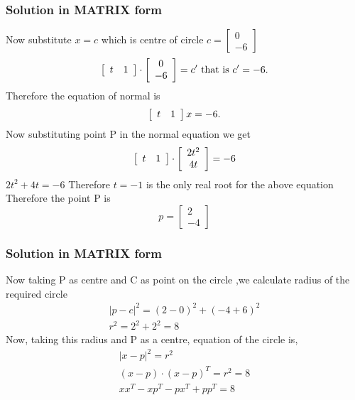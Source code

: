 \documentclass{beamer}
\begin{document}
\begin{frame}
\frametitle{Solution in MATRIX form}
Now substitute $x=c$ which is centre of circle  $c=\left[ 
  \begin{array}{ c  }
     0\\
    -6
  \end{array} \right]$
  \[
  \left[ 
  \begin{array}{ c c }
     t&1
  \end{array} \right]\cdot \left[ 
  \begin{array}{ c }
     0\\
    -6
  \end{array} \right]=c^{\prime}
  \text{ that is  }  c^{\prime}=-6.
  \]
  Therefore the equation of normal is
  \[\left[ 
  \begin{array}{ c c }
     t&1
  \end{array} \right]x=-6.
  \]
  Now substituting point P in the normal equation we get 
  \[
  \left[ 
  \begin{array}{ c c }
     t&1\\
  \end{array} \right]\cdot \left[ 
  \begin{array}{ c }
     2t^2\\
     4t
  \end{array} \right]=-6
  \]
   $2t^2+4t=-6$
Therefore $t=-1$ is the only real root for the above equation 
Therefore the point P is 
$$p=\left[ 
  \begin{array}{ c  }
     2\\
    -4
  \end{array} \right]
 $$

\end{frame}


\begin{frame}
\frametitle{Solution in MATRIX form}
Now taking P as centre and C as point on the circle ,we calculate radius of the required circle
\begin{gather*}
|p-c|^{2}=(2-0)^{2}+(-4+6)^{2} \\
r^2 = 2^{2} + 2^{2} = 8
\end{gather*}
Now, taking this radius and P as a centre, equation of the circle is,
\begin{gather*}
|x-p|^{2} = r^{2}\\
\left( x-p \right)\cdot (x-p)^{T} = r^{2} = 8\\
xx^{T} - xp^{T} - px^{T} + pp^{T} = 8
\end{gather*}
\end{frame}
\end{document}
